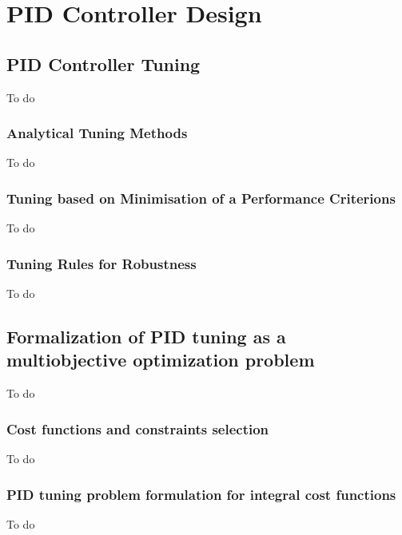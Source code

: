 \chapter{PID Controller Design}

\section{PID Controller Tuning}
To do
\subsection{Analytical Tuning Methods}
To do
\subsection{Tuning based on Minimisation of a Performance Criterions}
To do
\subsection{Tuning Rules for Robustness}
To do
%
\section{Formalization of PID tuning as a multiobjective optimization problem}
\label{sec:FormPIDMOOP}
To do
\subsection{Cost functions and constraints selection}
\label{sec:CostFunSelec}
To do
\subsection{PID tuning problem formulation for integral cost functions}
\label{sec:CostProbPID}
To do